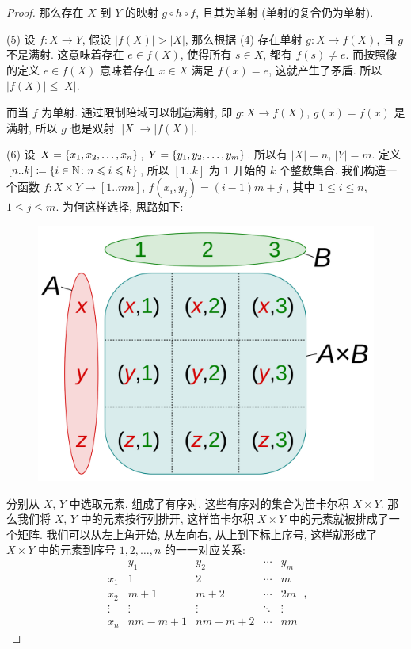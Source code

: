 \documentclass[UTF8]{ctexart}
\theoremstyle{mystyle}
\theoremstyle{myremark}
\theoremstyle{plain}
\newcommand{\N}{\mathbb N}
\DeclarePairedDelimiter\set{\{}{\}}
\begin{document}
\begin{proof}
    那么存在 $ X $ 到 $ Y $ 的映射 $ g \circ h \circ f $, 且其为单射 (单射的复合仍为单射).

    (5) 设 $ f \colon X \to Y $, 假设 $ |f(X)| > |X| $, 那么根据 (4) 存在单射 $ g \colon X \to f(X) $, 且 $ g $ 不是满射. 这意味着存在 $ e \in f(X) $, 使得所有 $ s \in X $, 都有 $ f(s) \neq e $. 而按照像的定义 $ e \in f(X) $ 意味着存在 $ x \in X $ 满足 $ f(x) = e $, 这就产生了矛盾. 所以 $ |f(X)| \leqslant |X| $.

    而当 $ f $ 为单射. 通过限制陪域可以制造满射, 即 $ g \colon X \to f(X) $, $ g(x) = f(x) $ 是满射, 所以 $ g $ 也是双射. $ |X| \to |f(X)| $.

    (6) 设 $ X = \set{x_1, x_2, \dots, x_n} $, $ Y = \set{y_1, y_2, \dots, y_m} $. 所以有 $ |X| = n $, $ |Y| = m $. 定义 $ [n..k] \coloneqq \set{i \in \N \colon n \leqslant i \leqslant k} $, 所以 $ [1..k] $ 为 $ 1 $ 开始的 $ k $ 个整数集合. 我们构造一个函数 $ f \colon X \times Y \to [1..mn] $, $ f(x_i, y_j) = (i - 1) m + j $ , 其中 $ 1 \leqslant i \leqslant n $, $ 1 \leqslant j \leqslant m $. 为何这样选择, 思路如下:

    \begin{figure}[H]
        \centering
        \includegraphics[width = 0.4\linewidth]{./images/Cartesian_Product.png}
    \end{figure}
    
    分别从 $ X $, $ Y $ 中选取元素, 组成了有序对, 这些有序对的集合为笛卡尔积 $ X \times Y $. 那么我们将 $ X $, $ Y $ 中的元素按行列排开, 这样笛卡尔积 $ X \times Y $ 中的元素就被排成了一个矩阵. 我们可以从左上角开始, 从左向右, 从上到下标上序号, 这样就形成了 $ X \times Y $ 中的元素到序号 $ 1, 2, \dots, n $ 的一一对应关系:
    \[     
    \begin{matrix}
         & y_1 & y_2 & \cdots & y_m \\
        x_1 & 1 & 2 & \cdots & m \\
        x_2 & m + 1 & m + 2 & \cdots & 2m \\
        \vdots & \vdots & \vdots & \ddots & \vdots \\
        x_n & n m - m + 1 & n m - m + 2 & \cdots & n m
    \end{matrix} \,,
    \]


\end{proof}
\end{document}
